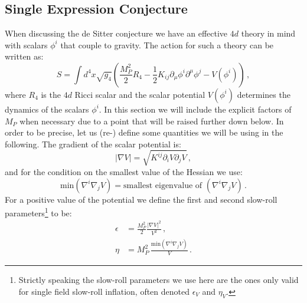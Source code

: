 \documentclass[a4paper,12pt]{report}
\newcommand{\be}{\begin{equation}}
\newcommand{\ee}{\end{equation}}
\newcommand{\bea}{\begin{equation}\begin{aligned}}
\newcommand{\eea}{\end{aligned}\end{equation}}
\begin{document}
\subsection{Single Expression Conjecture}
When discussing the de Sitter conjecture we have an effective $4d$ theory in mind with scalars $\phi^ i$ that couple to gravity. The action for such a theory can be written as:
\be 
S = \int d^4x \sqrt{g_4} \left(\frac{M_P^ 2}{2} R_4 - \frac{1}{2} K_{ij} \partial_\mu \phi^ i \partial^ \mu \phi^ j - V(\phi^ i)\right)\,,
\label{eq:leeact}
\ee
where $R_4$ is the $4d$ Ricci scalar and the scalar potential $V(\phi^ i)$ determines the dynamics of the scalars $\phi^ i$. In this section we will include the explicit factors of $M_P$ when necessary due to a point that will be raised further down below. In order to be precise, let us (re-) define some quantities we will be using in the following. The gradient of the scalar potential is:
\be 
|\nabla V| = \sqrt{K^{ij}\partial_i V \partial_j V}\,,
\ee
and for the condition on the smallest value of the Hessian we use:
\be 
\text{min}(\nabla^i \nabla_j V) = \text{smallest eigenvalue of }(\nabla^i \nabla_j V)\,.
\ee
For a positive value of the potential we define the first and second slow-roll parameters\footnote{Strictly speaking the slow-roll parameters we use here are the ones only valid for single field slow-roll inflation, often denoted $\epsilon_V$ and $\eta_V$.} to be:
\bea 
\epsilon &= \frac{M_P^ 2}{2} \frac{|\nabla V|^2}{V^2}\,,\\
\eta &= M_P^ 2 \, \frac{\text{min}(\nabla^i \nabla_j V)}{V}\,.
\eea
\end{document}

